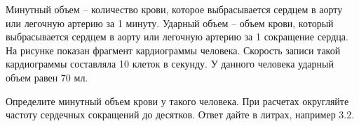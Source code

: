 
Минутный
объем – количество крови, которое выбрасывается сердцем в аорту или легочную
артерию за 1 минуту. Ударный объем – объем крови, который выбрасывается сердцем
в аорту или легочную артерию за 1 сокращение сердца. На рисунке показан
фрагмент кардиограммы человека. Скорость записи такой кардиограммы составляла
10  клеток в секунду.  У данного человека
ударный объем равен 70  мл.


Определите минутный объем крови у такого человека.
При расчетах округляйте частоту сердечных сокращений до десятков. Ответ дайте в
литрах, например 3.2. 

\explanationSection

